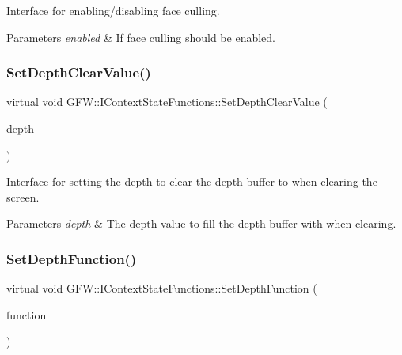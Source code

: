 Interface for enabling/disabling face culling. 


\begin{DoxyParams}{Parameters}
{\em enabled} & If face culling should be enabled. \\
\hline
\end{DoxyParams}
\mbox{\label{class_g_f_w_1_1_i_context_state_functions_a9adfbb8db43de0e7479c57884a00902b}} 
\subsubsection{\texorpdfstring{Set\+Depth\+Clear\+Value()}{SetDepthClearValue()}}
{\footnotesize\ttfamily virtual void G\+F\+W\+::\+I\+Context\+State\+Functions\+::\+Set\+Depth\+Clear\+Value (\begin{DoxyParamCaption}\item[{float}]{depth }\end{DoxyParamCaption})\hspace{0.3cm}{\ttfamily [pure virtual]}}



Interface for setting the depth to clear the depth buffer to when clearing the screen. 


\begin{DoxyParams}{Parameters}
{\em depth} & The depth value to fill the depth buffer with when clearing. \\
\hline
\end{DoxyParams}
\mbox{\label{class_g_f_w_1_1_i_context_state_functions_a678a64426fe120cb1ec93de04b760683}} 
\subsubsection{\texorpdfstring{Set\+Depth\+Function()}{SetDepthFunction()}}
{\footnotesize\ttfamily virtual void G\+F\+W\+::\+I\+Context\+State\+Functions\+::\+Set\+Depth\+Function (\begin{DoxyParamCaption}\item[{\hyperlink{namespace_g_f_w_a2eabb5a646179bceaab2d5e3bfce2316}{Test\+Function}}]{function }\end{DoxyParamCaption})\hspace{0.3cm}{\ttfamily [pure virtual]}}



